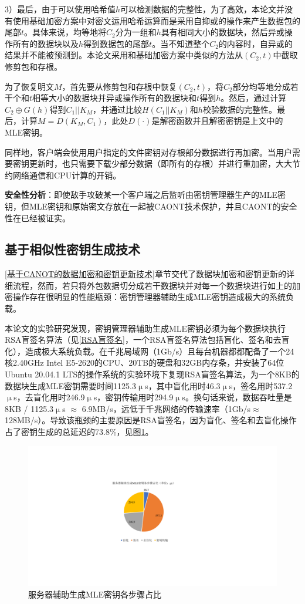\documentclass[promaster]{thesis-uestc}
\begin{document}
3）最后，由于可以使用哈希值$h$可以检测数据的完整性，为了高效，本论文并没有使用基础加密方案中对密文运用哈希运算而是采用自抑或的操作来产生数据包的尾部$t$。具体来说，均等地将$C_2$分为一组和$h$具有相同大小的数据块，然后异或操作所有的数据块以及$h$得到数据包的尾部$t$。当不知道整个$C_2$的内容时，自异或的结果并不能被预测到。本论文采用和基础加密方案中类似的方法从$(C_2, t)$中截取修剪包和存根。

为了恢复明文$M$，首先要从修剪包和存根中恢复$(C_2, t)$，将$C_2$部分均等地分成若干个和$t$相等大小的数据块并异或操作所有的数据块和$t$得到$h$。然后，通过计算$C_2 \oplus G(h)$得到$C_1||K_M$，并通过比较$H(C_1||K_M)$和$h$校验数据的完整性。最后，计算$M = D(K_M, C_1)$，此处$D(\cdot)$是解密函数并且解密密钥是上文中的MLE密钥。

同样地，客户端会使用用户指定的文件密钥对存根部分数据进行再加密。当用户需要密钥更新时，也只需要下载少部分数据（即所有的存根）并进行重加密，大大节约网络通信和CPU计算的开销。

\textbf{安全性分析}：即使敌手攻破某一个客户端之后监听由密钥管理器生产的MLE密钥，但MLE密钥和原始密文存放在一起被CAONT技术保护，并且CAONT的安全性在\cite{li2015cdstore}已经被证实。

\subsection{基于相似性密钥生成技术}
\ref{基于CANOT的数据加密和密钥更新技术}章节交代了数据块加密和密钥更新的详细流程，然而，若只将外包数据切分成若干数据块并对每一个数据块进行如上的加密操作存在很明显的性能瓶颈：密钥管理器辅助生成MLE密钥造成极大的系统负载。

本论文的实验研究发现，密钥管理器辅助生成MLE密钥必须为每个数据块执行RSA盲签名算法（见\ref{RSA盲签名}，一个RSA盲签名算法包括盲化、签名和去盲化），造成极大系统负载。在千兆局域网（1Gb/s）且每台机器都都配备了一个24核2.40GHz Intel E5-2620的CPU、20TB的硬盘和32GB内存条，并安装了64位Ubuntu 20.04.1 LTS的操作系统的实验环境下复现RSA盲签名算法，为一个8KB的数据块生成MLE密钥需要时间1125.3$\upmu$s，其中盲化用时46.3$\upmu$s，签名用时537.2$\upmu$s，去盲化用时246.9$\upmu$s，密钥传输用时294.9$\upmu$s。换句话来说，数据吞吐量是8KB / 1125.3$\upmu$s $\approx$ 6.9MB/s，远低于千兆网络的传输速率（1Gb/s$\approx$128MB/s）。导致该瓶颈的主要原因是RSA盲签名，因为盲化、签名和去盲化操作占了密钥生成的总延迟的73.8\%，见图\ref{服务器辅助生成MLE密钥各步骤占比}。

\begin{figure}[htbp]
    \centering
    \includegraphics[width = 0.55\linewidth]{pic/服务器辅助生成MLE密钥各步骤占比.pdf}
    \caption{服务器辅助生成MLE密钥各步骤占比}
    \label{服务器辅助生成MLE密钥各步骤占比}
\end{figure}
\end{document}
